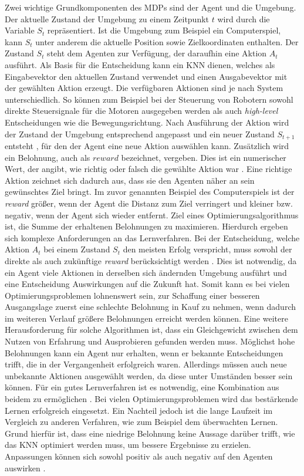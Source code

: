 Zwei wichtige Grundkomponenten des \acp{MDP} sind der Agent und die Umgebung. Der aktuelle Zustand der Umgebung zu einem Zeitpunkt $t$ wird durch die Variable $S_t$ repräsentiert. Ist die Umgebung zum Beispiel ein Computerspiel, kann $S_t$ unter anderem die aktuelle Position sowie Zielkoordinaten enthalten. Der Zustand $S_t$ steht dem Agenten zur Verfügung, der daraufhin eine Aktion $A_t$ ausführt. Als Basis für die Entscheidung kann ein \ac{KNN} dienen, welches als Eingabevektor den aktuellen Zustand verwendet und einen Ausgabevektor mit der gewählten Aktion erzeugt. Die verfügbaren Aktionen sind je nach System unterschiedlich. So können zum Beispiel bei der Steuerung von Robotern sowohl direkte Steuersignale für die Motoren ausgegeben werden als auch \emph{high-level} Entscheidungen wie die Bewegungsrichtung. Nach Ausführung der Aktion wird der Zustand der Umgebung entsprechend angepasst und ein neuer Zustand $S_{t+1}$ entsteht \cite{sutton2018reinforcement}, für den der Agent eine neue Aktion auswählen kann. Zusätzlich wird ein Belohnung, auch als $reward$ bezeichnet, vergeben. Dies ist ein numerischer Wert, der angibt, wie richtig oder falsch die gewählte Aktion war \cite{zell2003simulation}. Eine richtige Aktion zeichnet sich dadurch aus, dass sie den Agenten näher an sein gewünschtes Ziel bringt. Im zuvor genannten Beispiel des Computerspiels ist der \emph{reward} größer, wenn der Agent die Distanz zum Ziel verringert und kleiner bzw. negativ, wenn der Agent sich wieder entfernt. Ziel eines Optimierungsalgorithmus ist, die Summe der erhaltenen Belohnungen zu maximieren. Hierdurch ergeben sich komplexe Anforderungen an das Lernverfahren. Bei der Entscheidung, welche Aktion $A_t$ bei einem Zustand $S_t$ den meisten Erfolg verspricht, muss sowohl der direkte als auch zukünftige \emph{reward} berücksichtigt werden \cite{sutton2018reinforcement}. Dies ist notwendig, da ein Agent viele Aktionen in derselben sich ändernden Umgebung ausführt und eine Entscheidung Auswirkungen auf die Zukunft hat. Somit kann es bei vielen Optimierungsproblemen  lohnenswert sein, zur Schaffung einer besseren Ausgangslage zuerst eine schlechte Belohnung in Kauf zu nehmen, wenn dadurch im weiteren Verlauf größere Belohnungen erreicht werden können. Eine weitere Herausforderung für solche Algorithmen ist, dass ein Gleichgewicht zwischen dem Nutzen von Erfahrung und Ausprobieren gefunden werden muss. Möglichst hohe Belohnungen kann ein Agent nur erhalten, wenn er bekannte Entscheidungen trifft, die in der Vergangenheit erfolgreich waren. Allerdings müssen auch neue unbekannte Aktionen ausgewählt werden, da diese unter Umständen besser sein können. Für ein gutes Lernverfahren ist es notwendig, eine Kombination aus beidem zu ermöglichen \cite{sutton2018reinforcement}. Bei vielen Optimierungsproblemen wird das bestärkende Lernen erfolgreich eingesetzt. Ein Nachteil jedoch ist die lange Laufzeit im Vergleich zu anderen Verfahren, wie zum Beispiel dem überwachten Lernen. Grund hierfür ist, dass eine niedrige Belohnung keine Aussage darüber trifft, wie das \ac{KNN} optimiert werden muss, um bessere Ergebnisse zu erzielen. Anpassungen können sich sowohl positiv als auch negativ auf den Agenten auswirken \cite{zell2003simulation}. 

